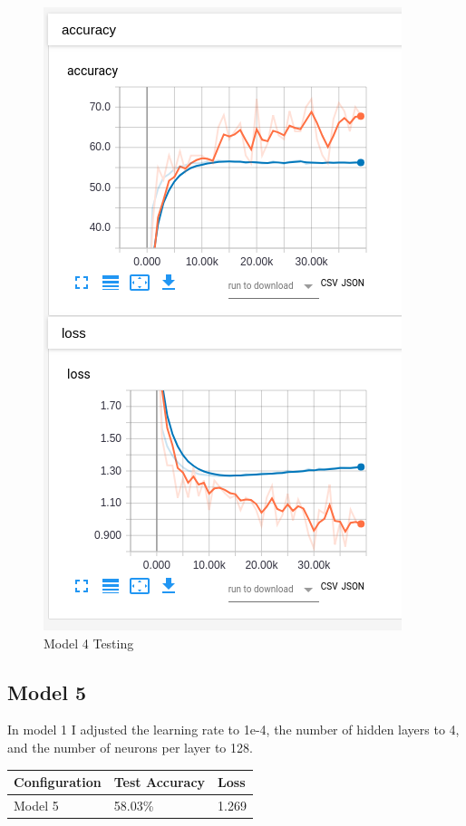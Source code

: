 \documentclass[12pt, letter]{article}
\begin{document}
  \begin{figure}[H]
    \centering
    \includegraphics[width=0.8 \textwidth]{lr1e4hidden4}
    \caption{Model 4 Testing}
    \label{fig:eg}
  \end{figure}
  \subsection{Model 5}
  In model 1 I adjusted the learning rate to {1e-4}, the number of hidden layers
  to 4, and the number of neurons per layer to 128. \\

  \begin{tabular}{lll}
    Configuration  & Test Accuracy & Loss  \\
    \hline
    Model 5        & 58.03\%        & 1.269
  \end{tabular}
\end{document}
